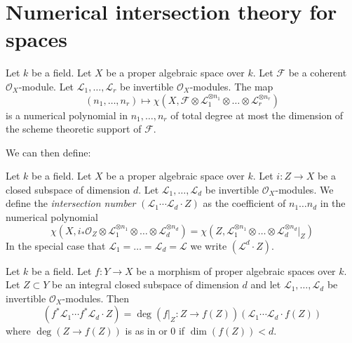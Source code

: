 \section{Numerical intersection theory for spaces}
\begin{lemma}\label{lemma-numerical-polynomial-from-euler}
Let $k$ be a field. Let $X$ be a proper algebraic space over $k$.
Let $\mathcal{F}$ be a coherent $\mathcal{O}_X$-module. Let
$\mathcal{L}_1, \ldots, \mathcal{L}_r$ be invertible $\mathcal{O}_X$-modules.
The map
$$
(n_1, \ldots, n_r) \longmapsto
\chi(X, \mathcal{F} \otimes
\mathcal{L}_1^{\otimes n_1} \otimes \ldots \otimes
\mathcal{L}_r^{\otimes n_r})
$$
is a numerical polynomial in $n_1, \ldots, n_r$ of total degree at
most the dimension of the scheme theoretic support of $\mathcal{F}$.
\end{lemma}
We can then define:
\begin{definition}\label{tag:0BEP}
Let $k$ be a field. Let $X$ be a proper algebraic space over $k$. Let
$i : Z \to X$ be a closed subspace of dimension $d$. Let
$\mathcal{L}_1, \ldots, \mathcal{L}_d$ be invertible
$\mathcal{O}_X$-modules. We define the {\it intersection number}
$(\mathcal{L}_1 \cdots \mathcal{L}_d \cdot Z)$
as the coefficient of $n_1 \ldots n_d$ in the numerical polynomial
$$
\chi(X, i_*\mathcal{O}_Z \otimes \mathcal{L}_1^{\otimes n_1} \otimes
\ldots \otimes \mathcal{L}_d^{\otimes n_d}) =
\chi(Z, \mathcal{L}_1^{\otimes n_1} \otimes
\ldots \otimes \mathcal{L}_d^{\otimes n_d}|_Z)
$$
In the special
case that $\mathcal{L}_1 = \ldots = \mathcal{L}_d = \mathcal{L}$
we write $(\mathcal{L}^d \cdot Z)$.
\end{definition}
\begin{lemma}
\label{lemma-intersection-number-and-pullback}
Let $k$ be a field. Let $f : Y \to X$ be a morphism of proper algebraic spaces
over $k$.
Let $Z \subset Y$ be an integral closed subspace of dimension $d$ and let
$\mathcal{L}_1, \ldots, \mathcal{L}_d$ be invertible $\mathcal{O}_X$-modules.
Then
$$
(f^*\mathcal{L}_1 \cdots f^*\mathcal{L}_d \cdot Z) =
\deg(f|_Z : Z \to f(Z)) (\mathcal{L}_1 \cdots \mathcal{L}_d \cdot f(Z))
$$
where $\deg(Z \to f(Z))$ is as in
{\it \cite[\href{http://stacks.math.columbia.edu/tag/0AD6}{Tag 0AD6}]{stacks-project}}
or $0$ if $\dim(f(Z)) < d$.
\end{lemma}
